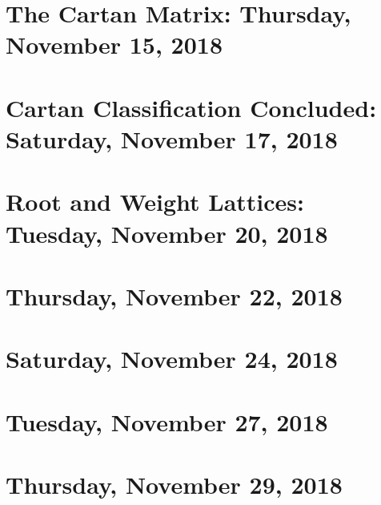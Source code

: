 \documentclass[reqno]{amsart}
\begin{document}
\section{The Cartan Matrix: Thursday, November 15, 2018}
    
\section{Cartan Classification Concluded: Saturday, November 17, 2018}
    
\section{Root and Weight Lattices: Tuesday, November 20, 2018}
    
\section{Thursday, November 22, 2018}
    
\section{Saturday, November 24, 2018}
    
\section{Tuesday, November 27, 2018}
    
\section{Thursday, November 29, 2018}
    
\end{document}
